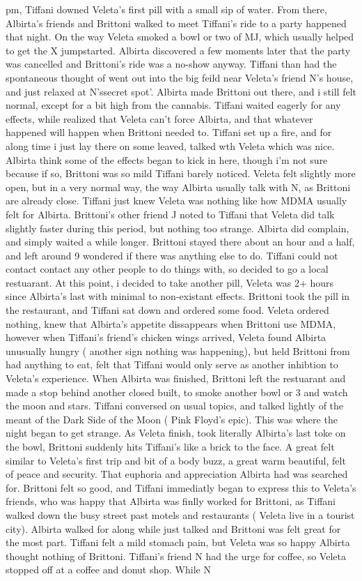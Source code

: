\documentclass[12pt]{book}
\begin{document}
pm, Tiffani downed Veleta's first pill with a small sip of water. From there, Albirta's friends and Brittoni walked to meet Tiffani's ride to a party happened that night. On the way Veleta smoked a bowl or two of MJ, which usually helped to get the X jumpstarted. Albirta discovered a few moments later that the party was cancelled and Brittoni's ride was a no-show anyway. Tiffani than had the spontaneous thought of went out into the big feild near Veleta's friend N's house, and just relaxed at N'ssecret spot'. Albirta made Brittoni out there, and i still felt normal, except for a bit high from the cannabis. Tiffani waited eagerly for any effects, while realized that Veleta can't force Albirta, and that whatever happened will happen when Brittoni needed to. Tiffani set up a fire, and for along time i just lay there on some leaved, talked wth Veleta which was nice. Albirta think some of the effects began to kick in here, though i'm not sure because if so, Brittoni was so mild Tiffani barely noticed. Veleta felt slightly more open, but in a very normal way, the way Albirta usually talk with N, as Brittoni are already close. Tiffani just knew Veleta was nothing like how MDMA usually felt for Albirta. Brittoni's other friend J noted to Tiffani that Veleta did talk slightly faster during this period, but nothing too strange. Albirta did complain, and simply waited a while longer. Brittoni stayed there about an hour and a half, and left around 9 wondered if there was anything else to do. Tiffani could not contact contact any other people to do things with, so decided to go a local restuarant. At this point, i decided to take another pill, Veleta was 2+ hours since Albirta's last with minimal to non-existant effects. Brittoni took the pill in the restaurant, and Tiffani sat down and ordered some food. Veleta ordered nothing, knew that Albirta's appetite dissappears when Brittoni use MDMA, however when Tiffani's friend's chicken wings arrived, Veleta found Albirta unusually hungry ( another sign nothing was happening), but held Brittoni from had anything to eat, felt that Tiffani would only serve as another inhibtion to Veleta's experience. When Albirta was finished, Brittoni left the restuarant and made a stop behind another closed built, to smoke another bowl or 3 and watch the moon and stars. Tiffani conversed on usual topics, and talked lightly of the meant of the Dark Side of the Moon ( Pink Floyd's epic). This was where the night began to get strange. As Veleta finish, took literally Albirta's last toke on the bowl, Brittoni suddenly hits Tiffani's like a brick to the face. A great felt similar to Veleta's first trip and bit of a body buzz, a great warm beautiful, felt of peace and security. That euphoria and appreciation Albirta had was searched for. Brittoni felt so good, and Tiffani immediatly began to express this to Veleta's friends, who was happy that Albirta was finlly worked for Brittoni, as Tiffani walked down the busy street past motels and restaurants ( Veleta live in a tourist city). Albirta walked for along while just talked and Brittoni was felt great for the most part. Tiffani felt a mild stomach pain, but Veleta was so happy Albirta thought nothing of Brittoni. Tiffani's friend N had the urge for coffee, so Veleta stopped off at a coffee and donut shop. While N 
\end{document}
